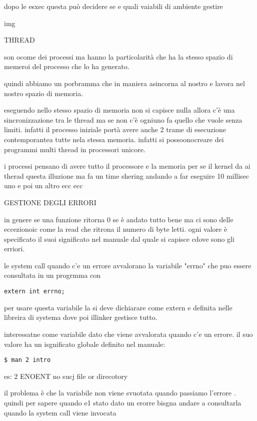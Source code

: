 dopo le esxec questa può decidere se e quali vaiabili di ambiente gestire


img



THREAD

son ocome dei processi ma hanno la particolarità che ha la stesso spazio di memeroi del processo che lo ha generato.

quindi abbiamo un porbramma che in maniera asincorna al nostro e lavora nel nostro spazio di memoria.

eseguendo nello stesso spazio di memoria non si capisce nulla allora c'è una sincronizzazione tra le thread ma se non c'è ogniuno fa quello che vuole senza limiti. infatti il processo iniziale portà avere anche 2 trame di esecuzione contemporantea tutte nela stessa memoria. infatti si possoonocreare dei programmi multi thread in processori unicore.

i processi pensano di avere tutto il processore e la memoria per se il kernel da ai therad questa illuzione ma fa un time shering andando a far eseguire 10 millisec uno e poi un altro ecc ecc




GESTIONE DEGLI ERRORI

in genere se una funzione ritorna 0 se è andato tutto bene ma ci sono delle eccezionoic come la read che ritrona il numero di byte letti. ogni valore è specificato il suoi significato nel manuale dal quale si capisce cdove sono gli erriori.

le system call quando c'e un errore avvalorano la variabile "errno" che puo essere consultata in un progrmma con 

\begin{lstlisting}
extern int errno;
\end{lstlisting}

per usare questa variabile la si deve dichiarare come extern e definita nelle libreira di systema dove poi illinker gestisce tutto.

interessatne come variabile dato che viene avvalorata quando c'e un errore. il suo valore ha un isgnificato globale definito nel manuale:

\begin{lstlisting}
$ man 2 intro
\end{lstlisting}


es: 2 ENOENT no sucj file or direcotory 

il problema è che la variabile non viene svuotata quando passiamo l'errore . quindi per sapere quando e1 stato dato un erorre bisgna andare a consultarla quando la system call viene invocata




